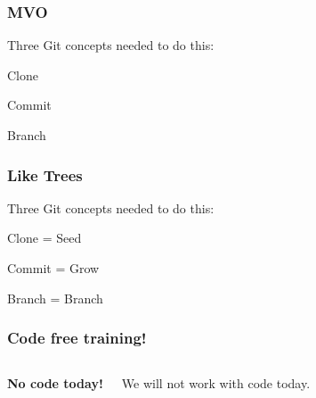 \documentclass[aspectratio=169]{beamer} %
\begin{document}
\begin{frame}
\frametitle{MVO}

	\hspace*{2.5cm}\Large{Three Git concepts needed to do this:}

	\begin{itemize}
		\setlength{\itemindent}{3cm}
		\Large{\item Clone}
		\Large{\item Commit}
		\Large{\item Branch}
	\end{itemize}

\end{frame}


\begin{frame}
\frametitle{Like Trees}

	\hspace*{2.5cm}\Large{Three Git concepts needed to do this:}

	\begin{itemize}
		\setlength{\itemindent}{3cm}
		\Large{\item Clone = Seed}
		\Large{\item Commit = Grow}
		\Large{\item Branch = Branch}
	\end{itemize}

\end{frame}

\begin{frame}
\frametitle{Code free training!}

	\begin{columns}[c]


		\textbf{No code today!}

		\vspace{.5cm}

		We will not work with code today.



	\end{columns}
\end{frame}
\end{document}
